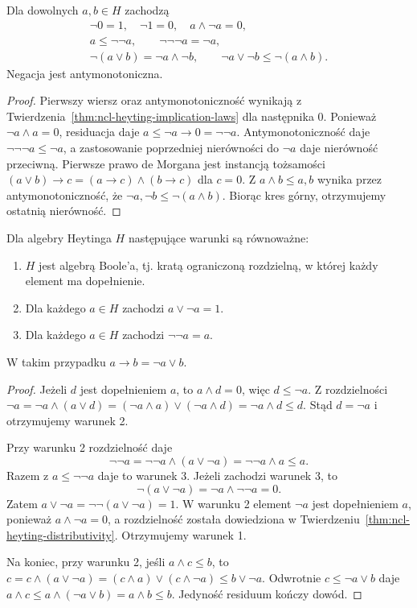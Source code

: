 \begin{stwierdzenie}
\label{prop:ncl-heyting-negation-laws}
Dla dowolnych $a,b\in H$ zachodzą
\[
\begin{gathered}
 \neg0=1,\quad \neg1=0,\quad a\wedge\neg a=0,\\
 a\leq\neg\neg a,\qquad \neg\neg\neg a=\neg a,\\
 \neg(a\vee b)=\neg a\wedge\neg b,\qquad
 \neg a\vee\neg b\leq\neg(a\wedge b).
\end{gathered}
\]
Negacja jest antymonotoniczna.
\end{stwierdzenie}
\begin{proof}
Pierwszy wiersz oraz antymonotoniczność
wynikają z Twierdzenia~\ref{thm:ncl-heyting-implication-laws}
dla następnika $0$.
Ponieważ $\neg a\wedge a=0$, residuacja daje
$a\leq\neg a\to0=\neg\neg a$.
Antymonotoniczność daje $\neg\neg\neg a\leq\neg a$,
a zastosowanie poprzedniej nierówności do $\neg a$
daje nierówność przeciwną.
Pierwsze prawo de Morgana jest instancją tożsamości
$(a\vee b)\to c=(a\to c)\wedge(b\to c)$
dla $c=0$.
Z $a\wedge b\leq a,b$ wynika przez antymonotoniczność,
że $\neg a,\neg b\leq\neg(a\wedge b)$.
Biorąc kres górny, otrzymujemy ostatnią nierówność.
\end{proof}

\begin{twierdzenie}
\label{thm:ncl-heyting-boolean}
Dla algebry Heytinga $H$ następujące warunki
są równoważne:
\begin{enumerate}
\item $H$ jest algebrą Boole'a, tj. kratą ograniczoną
      rozdzielną, w której każdy element ma dopełnienie.
\item Dla każdego $a\in H$ zachodzi $a\vee\neg a=1$.
\item Dla każdego $a\in H$ zachodzi $\neg\neg a=a$.
\end{enumerate}
W takim przypadku $a\to b=\neg a\vee b$.
\end{twierdzenie}
\begin{proof}
Jeżeli $d$ jest dopełnieniem $a$, to $a\wedge d=0$,
więc $d\leq\neg a$.
Z rozdzielności
$\neg a=\neg a\wedge(a\vee d)
=(\neg a\wedge a)\vee(\neg a\wedge d)
=\neg a\wedge d\leq d$.
Stąd $d=\neg a$ i otrzymujemy warunek 2.

Przy warunku 2 rozdzielność daje
\[
 \neg\neg a=\neg\neg a\wedge(a\vee\neg a)
             =\neg\neg a\wedge a\leq a.
\]
Razem z $a\leq\neg\neg a$ daje to warunek 3.
Jeżeli zachodzi warunek 3, to
\[
 \neg(a\vee\neg a)=\neg a\wedge\neg\neg a=0.
\]
Zatem $a\vee\neg a=\neg\neg(a\vee\neg a)=1$.
W warunku 2 element $\neg a$ jest dopełnieniem
$a$, ponieważ $a\wedge\neg a=0$, a rozdzielność
została dowiedziona w
Twierdzeniu~\ref{thm:ncl-heyting-distributivity}.
Otrzymujemy warunek 1.

Na koniec, przy warunku 2, jeśli $a\wedge c\leq b$,
to
$c=c\wedge(a\vee\neg a)
=(c\wedge a)\vee(c\wedge\neg a)\leq b\vee\neg a$.
Odwrotnie $c\leq\neg a\vee b$ daje
$a\wedge c\leq a\wedge(\neg a\vee b)=a\wedge b\leq b$.
Jedyność residuum kończy dowód.
\end{proof}

